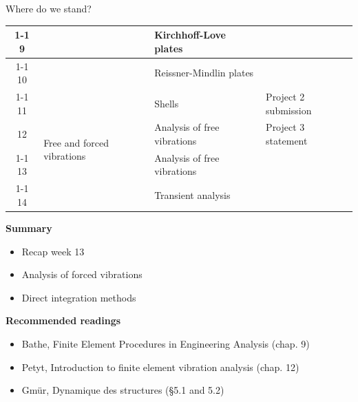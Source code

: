 \documentclass[aspectratio=169]{beamer}
\begin{document}
{\begin{frame}{Where do we stand?}
\begin{center}
\begin{tabular}{|c|l|l|l|}
        \cline{1-1} \cline{3-4} 9          &                                                & Kirchhoff-Love plates              &                        \\
        \cline{1-1} \cline{3-4}
        10                                 &                                                & Reissner-Mindlin plates            &                        \\
        \cline{1-1} \cline{3-4}
        11                                 &                                                & Shells                             & Project 2 submission   \\
        \hline
        12                                 & \multirow{2}{7em}{Free and forced vibrations}  & Analysis of free vibrations        & Project 3 statement    \\
        \cline{1-1} \cline{3-4}
        13                                 &                                                & Analysis of free vibrations        &                        \\
        \cline{1-1} \cline{3-4}
        14                                 &                                                & Transient analysis                 &                        \\
        \hline
      \end{tabular}
    \end{center}
    \vspace{1cm}
  \end{frame}

  \begin{frame}
    \textbf{\large Summary}
    \begin{itemize}
      \item Recap week 13
      \item Analysis of forced vibrations
      \item Direct integration methods
    \end{itemize}
    \vspace{.5cm}

    \textbf{\large Recommended readings}
    \begin{itemize}
      \item[(B)] Bathe, Finite Element Procedures in Engineering Analysis (chap. 9)
      \item[(P)] Petyt, Introduction to finite element vibration analysis (chap. 12)
      \item[(G)] Gmür, Dynamique des structures (§5.1 and 5.2)
    \end{itemize}
  \end{frame}
}
\end{document}
